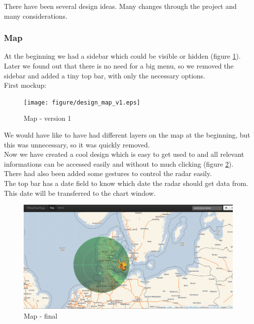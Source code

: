 There have been several design ideas. Many changes through the project and many considerations.

\subsubsection{Map}
At the beginning we had a sidebar which could be visible or hidden (figure \ref{fig:map_v1}). Later we found out that there is no need for a big menu, so we removed the sidebar and added a tiny top bar, with only the necessary options.\\
First mockup:
\begin{figure}[htbp]
   \centering
   \texttt{[image: figure/design\_map\_v1.eps]}
   \caption{Map - version 1}
   \label{fig:map_v1}
\end{figure}

We would have like to have had different layers on the map at the beginning, but this was unnecessary, so it was quickly removed.\\
Now we have created a cool design which is easy to get used to and all relevant informations can be accessed easily and without to much clicking (figure \ref{fig:map_final}).
There had also been added some gestures to control the radar easily.\\
The top bar has a date field to know which date the radar should get data from. This date will be transferred to the chart window.

\begin{figure}[htbp]
   \centering
   \includegraphics[width=1\linewidth]{figure/design_map_final.eps}
   \caption{Map - final}
   \label{fig:map_final}
\end{figure}

